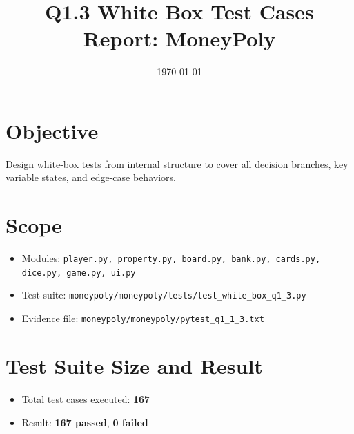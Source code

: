 \documentclass[11pt,a4paper]{article}
\title{Q1.3 White Box Test Cases Report: MoneyPoly}
\author{}
\date{\today}
\begin{document}
\maketitle

\section*{Objective}
Design white-box tests from internal structure to cover all decision branches, key variable states, and edge-case behaviors.

\section*{Scope}
\begin{itemize}
  \item Modules: \texttt{player.py, property.py, board.py, bank.py, cards.py, dice.py, game.py, ui.py}
  \item Test suite: \texttt{moneypoly/moneypoly/tests/test\_white\_box\_q1\_3.py}
  \item Evidence file: \texttt{moneypoly/moneypoly/pytest\_q1\_1\_3.txt}
\end{itemize}

\section*{Test Suite Size and Result}
\begin{itemize}
  \item Total test cases executed: \textbf{167}
  \item Result: \textbf{167 passed}, \textbf{0 failed}
\end{itemize}
\end{document}
